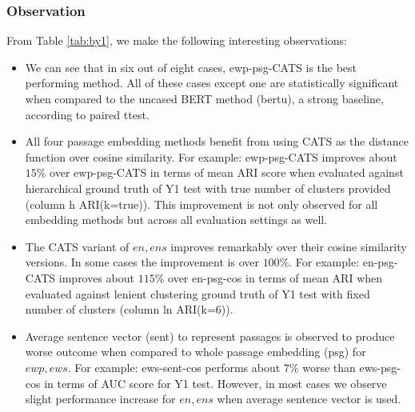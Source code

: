 \documentclass[sigconf,authordraft]{acmart}
\begin{document}
\subsubsection{Observation} From Table \ref{tab:by1}, we make the following interesting observations:
\begin{itemize}
    \item We can see that in six out of eight cases, ewp-psg-CATS is the best performing method. All of these cases except one are statistically significant when compared to the uncased BERT method (bertu), a strong baseline, according to paired ttest.
    \item All four passage embedding methods benefit from using CATS as the distance function over cosine similarity. For example: ewp-psg-CATS improves about $15$\% over ewp-psg-CATS in terms of mean ARI score when evaluated against hierarchical ground truth of Y1 test with true number of clusters provided (column h ARI(k=true)). This improvement is not only observed for all embedding methods but across all evaluation settings as well.
    \item The CATS variant of $en, ens$ improves remarkably over their cosine similarity versions. In some cases the improvement is over $100$\%. For example: en-psg-CATS improves about $115$\% over en-psg-cos in terms of mean ARI when evaluated against lenient clustering ground truth of Y1 test with fixed number of clusters (column ln ARI(k=6)).
    \item Average sentence vector (sent) to represent passages is observed to produce worse outcome when compared to whole passage embedding (psg) for $ewp, ews$. For example: ews-sent-cos performs about $7$\% worse than ews-psg-cos in terms of AUC score for Y1 test. However, in most cases we observe slight performance increase for $en, ens$ when average sentence vector is used.
\end{itemize}
\end{document}

